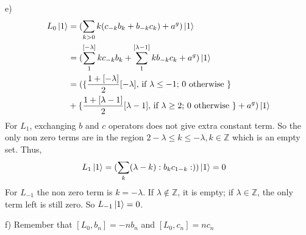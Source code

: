 \documentclass[12pt]{article}
\begin{document}
\begin{paragraph}{e)}
\begin{equation}
\begin{aligned}[t]
L_0\ket{1}&=(\sum\limits_{k>0}k(c_{-k}b_k+b_{-k}c_k)+a^g)\ket{1}\\
&=(\sum\limits_1^{[-\lambda]}kc_{-k}b_k+\sum\limits_1^{[\lambda-1]}kb_{-k}c_k+a^g)\ket{1}\\
&=(\{\frac{1+[-\lambda]}{2}[-\lambda],\,\text{if }\lambda\leq -1;\,0 \text{ otherwise }\}\\
&+\{\frac{1+[\lambda-1]}{2}[\lambda-1],\,\text{if }\lambda\geq 2;\,0 \text{ otherwise }\}+a^g)\ket{1}
\end{aligned}
\end{equation}
For $L_1$, exchanging $b$ and $c$ operators does not give extra constant term. So the only non zero terms are in the region $2-\lambda\leq k\leq -\lambda, k\in \mathbb{Z}$ which is an empty set. Thus,
\begin{equation}
\begin{aligned}[t]
L_1\ket{1}&=(\sum\limits_{k}(\lambda- k):b_{k}c_{1-k}:))\ket{1}=0
\end{aligned}
\end{equation}
For $L_{-1}$ the non zero term is $k=-\lambda$. If $\lambda\not\in\mathbb{Z}$, it is empty; if $\lambda\in\mathbb{Z}$, the only term left is still zero. So $L_{-1}\ket{1}=0$.
\end{paragraph}
\begin{paragraph}{f)}
Remember that $[L_0,b_n]=-nb_n$ and $[L_0,c_n]=nc_n$
\end{paragraph}
\end{document}
